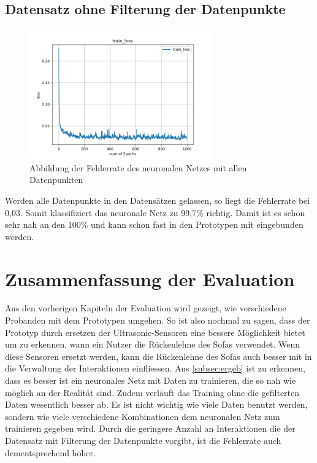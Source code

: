 \subsection{Datensatz ohne Filterung der Datenpunkte}
\begin{figure}[H]
	\centering
		\includegraphics[width=0.7\textwidth]{images/w_streu_nn.png}
	\caption{Abbildung der Fehlerrate des neuronalen Netzes mit allen Datenpunkten}
	\label{fig:w_streu}
\end{figure}

Werden alle Datenpunkte in den Datensätzen gelassen, so liegt die Fehlerrate bei 0,03. Somit klassifiziert das neuronale Netz zu 99,7\% richtig. Damit ist es schon sehr nah an den 100\% und kann schon fast in den Prototypen mit eingebunden werden.

\section{Zusammenfassung der Evaluation}
Aus den vorherigen Kapiteln der Evaluation wird gezeigt, wie verschiedene Probanden mit dem Prototypen umgehen. So ist also nochmal zu sagen, dass der Prototyp durch ersetzen der Ultrasonic-Sensoren eine bessere Möglichkeit bietet um zu erkennen, wann ein Nutzer die Rückenlehne des Sofas verwendet. Wenn diese Sensoren ersetzt werden, kann die Rückenlehne des Sofas auch besser mit in die Verwaltung der Interaktionen einfliessen. 
\newline
\newline
Aus \ref{subsec:ergeb} ist zu erkennen, dass es besser ist ein neuronales Netz mit Daten zu trainieren, die so nah wie möglich an der Realität sind. Zudem verläuft das Training ohne die gefilterten Daten wesentlich besser ab. Es ist nicht wichtig wie viele Daten benutzt werden, sondern wie viele verschiedene Kombinationen dem neuronalen Netz zum trainieren gegeben wird. Durch die geringere Anzahl an Interaktionen die der Datensatz mit Filterung der Datenpunkte vorgibt, ist die Fehlerrate auch dementsprechend höher.

